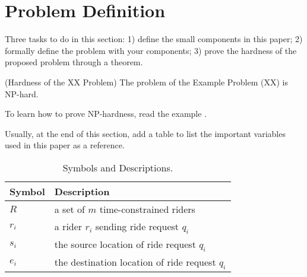 \section{Problem Definition}
\label{sec:problemDefinition}

Three tasks to do in this section: 1) define the small components in this paper; 2) formally define the problem with your components; 3) prove the hardness of the proposed problem through a theorem.

\begin{theorem} (Hardness of the XX Problem)
	The problem of the Example Problem (XX) is
	NP-hard. \label{theo:np}
\end{theorem}

To learn how to prove NP-hardness, read the example \cite{cheng2017utility}.

Usually, at the end of this section, add a table to list the important variables used in this paper as a reference.

\begin{table}
	\centering \vspace{-4ex}
	{\small\scriptsize
		\caption{\small Symbols and Descriptions.} \label{table0}
		\begin{tabular}{l|l}
			{\bf Symbol} & {\bf \qquad \qquad \qquad\qquad\qquad Description} \\ \hline \hline
			$R$   & a set of $m$ time-constrained riders\\
			$r_i$   & a rider $r_i$ sending ride request $q_i$\\
			$s_i$  & the source location of ride request $q_i$\\
			$e_i$   & the destination location of ride request $q_i$\\
			\hline
			\hline
		\end{tabular}
	}\vspace{-2ex}
\end{table}